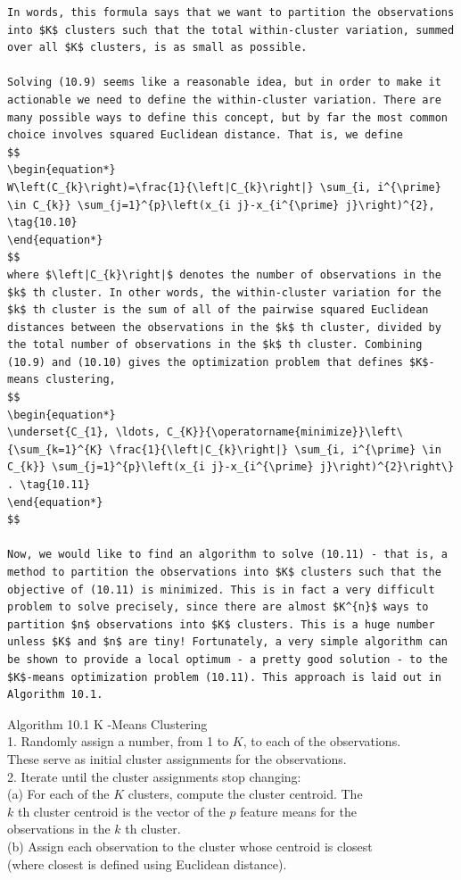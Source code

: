 \documentclass[10pt]{article}
\begin{document}
\begin{verbatim}
In words, this formula says that we want to partition the observations into $K$ clusters such that the total within-cluster variation, summed over all $K$ clusters, is as small as possible.

Solving (10.9) seems like a reasonable idea, but in order to make it actionable we need to define the within-cluster variation. There are many possible ways to define this concept, but by far the most common choice involves squared Euclidean distance. That is, we define
$$
\begin{equation*}
W\left(C_{k}\right)=\frac{1}{\left|C_{k}\right|} \sum_{i, i^{\prime} \in C_{k}} \sum_{j=1}^{p}\left(x_{i j}-x_{i^{\prime} j}\right)^{2}, \tag{10.10}
\end{equation*}
$$
where $\left|C_{k}\right|$ denotes the number of observations in the $k$ th cluster. In other words, the within-cluster variation for the $k$ th cluster is the sum of all of the pairwise squared Euclidean distances between the observations in the $k$ th cluster, divided by the total number of observations in the $k$ th cluster. Combining (10.9) and (10.10) gives the optimization problem that defines $K$-means clustering,
$$
\begin{equation*}
\underset{C_{1}, \ldots, C_{K}}{\operatorname{minimize}}\left\{\sum_{k=1}^{K} \frac{1}{\left|C_{k}\right|} \sum_{i, i^{\prime} \in C_{k}} \sum_{j=1}^{p}\left(x_{i j}-x_{i^{\prime} j}\right)^{2}\right\} . \tag{10.11}
\end{equation*}
$$

Now, we would like to find an algorithm to solve (10.11) - that is, a method to partition the observations into $K$ clusters such that the objective of (10.11) is minimized. This is in fact a very difficult problem to solve precisely, since there are almost $K^{n}$ ways to partition $n$ observations into $K$ clusters. This is a huge number unless $K$ and $n$ are tiny! Fortunately, a very simple algorithm can be shown to provide a local optimum - a pretty good solution - to the $K$-means optimization problem (10.11). This approach is laid out in Algorithm 10.1.
\end{verbatim}

Algorithm 10.1 K -Means Clustering\\
1. Randomly assign a number, from 1 to $K$, to each of the observations.\\
These serve as initial cluster assignments for the observations.\\
2. Iterate until the cluster assignments stop changing:\\
(a) For each of the $K$ clusters, compute the cluster centroid. The\\
$k$ th cluster centroid is the vector of the $p$ feature means for the\\
observations in the $k$ th cluster.\\
(b) Assign each observation to the cluster whose centroid is closest\\
(where closest is defined using Euclidean distance).
\end{document}
